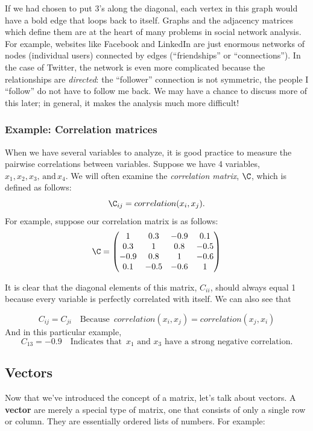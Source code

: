 \documentclass[
]{article}
\theoremstyle{definition}
\theoremstyle{definition}
\theoremstyle{definition}
\theoremstyle{definition}
\theoremstyle{remark}
\begin{document}
If we had chosen to put 3's along the diagonal, each vertex in this graph would have a bold edge that loops back to itself. Graphs and the adjacency matrices which define them are at the heart of many problems in social network analysis. For example, websites like Facebook and LinkedIn are just enormous networks of nodes (individual users) connected by edges (``friendships'' or ``connections''). In the case of Twitter, the network is even more complicated because the relationships are \emph{directed}: the ``follower'' connection is not symmetric, the people I ``follow'' do not have to follow me back. We may have a chance to discuss more of this later; in general, it makes the analysis much more difficult!

\hypertarget{introcorr}{%
\subsubsection{Example: Correlation matrices}\label{introcorr}}

When we have several variables to analyze, it is good practice to measure the pairwise correlations between variables. Suppose we have 4 variables, \(x_1, x_2, x_3,\,\mbox{and}\, x_4\). We will often examine the \emph{correlation matrix}, \(\C\), which is defined as follows:
\[\C_{ij}=correlation(x_i,x_j).\]
For example, suppose our correlation matrix is as follows:
\[\C=\left(\begin{matrix} 1 & 0.3 & -0.9 & 0.1\\0.3 & 1 & 0.8 & -0.5\\-0.9&0.8&1&-0.6\\0.1&-0.5&-0.6&1 \end{matrix}\right)\]

It is clear that the diagonal elements of this matrix, \(C_{ii}\), should always equal 1 because every variable is perfectly correlated with itself. We can also see that

\[C_{ij}=C_{ji}\quad \mbox{Because }\,correlation(x_i,x_j)=correlation(x_j,x_i)\]
And in this particular example,
\[C_{13}=-0.9 \quad \mbox{Indicates that }\,x_1\,\,\mbox{and}\,\,x_3\,\,\mbox{have a strong negative correlation.}\]

\hypertarget{vectors}{%
\subsection{Vectors}\label{vectors}}

Now that we've introduced the concept of a matrix, let's talk about vectors. A \textbf{vector} are merely a special type of matrix, one that consists of only a single row or column. They are essentially ordered lists of numbers. For example:
\end{document}
